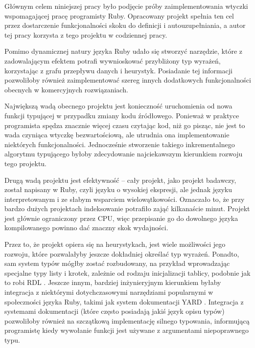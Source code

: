\documentclass[shortabstract,mgr]{iithesis}
\begin{document}
Głównym celem niniejszej pracy było podjęcie próby zaimplementowania wtyczki wspomagającej pracę programisty Ruby. Opracowany projekt spełnia ten cel przez dostarczenie funkcjonalności skoku do definicji i autouzupełniania, a autor tej pracy korzysta z tego projektu w codziennej pracy.

Pomimo dynamicznej natury języka Ruby udało się stworzyć narzędzie, które z zadowalającym efektem potrafi wywnioskować przybliżony typ wyrażeń, korzystając z grafu przepływu danych i heurystyk. Posiadanie tej informacji pozwoliłoby również zaimplementować szereg innych dodatkowych funkcjonalności obecnych w komercyjnych rozwiązaniach.

Największą wadą obecnego projektu jest konieczność uruchomienia od nowa funkcji typującej w przypadku zmiany kodu źródłowego. Ponieważ w praktyce programista spędza znacznie więcej czasu czytając kod, niż go pisząc, nie jest to wada czyniąca wtyczkę bezwartościową, ale utrudnia ona implementowanie niektórych funkcjonalności. Jednocześnie stworzenie takiego inkrementalnego algorytmu typującego byłoby zdecydowanie najciekawszym kierunkiem rozwoju tego projektu.

Drugą wadą projektu jest efektywność -- cały projekt, jako projekt badawczy, został napisany w Ruby, czyli języku o wysokiej ekspresji, ale jednak języku interpretowanym i ze słabym wsparciem wielowątkowości. Oznaczało to, że przy bardzo dużych projektach indeksowanie potrafiło zająć kilkanaście minut. Projekt jest głównie ograniczony przez CPU, więc przepisanie go do dowolnego języka kompilowanego powinno dać znaczny skok wydajności.

Przez to, że projekt opiera się na heurystykach, jest wiele możliwości jego rozwoju, które pozwalałyby jeszcze dokładniej określać typ wyrażeń. Ponadto, sam system typów mógłby zostać rozbudowany, na przykład wprowadzając specjalne typy listy i krotek, zależnie od rodzaju inicjalizacji tablicy, podobnie jak to robi RDL \cite{RDL}. Jeszcze innym, bardziej inżynieryjnym kierunkiem byłaby integracja z niektórymi dotychczasowymi narzędziami popularnymi w społeczności języka Ruby, takimi jak system dokumentacji YARD \cite{YARD}. Integracja z systemami dokumentacji (które często posiadają jakiś język opisu typów) pozwoliłoby również na szczątkową implementację silnego typowania, informującą programistę kiedy wywołanie funkcji jest używane z argumentami niepoprawnego typu.
\end{document}
